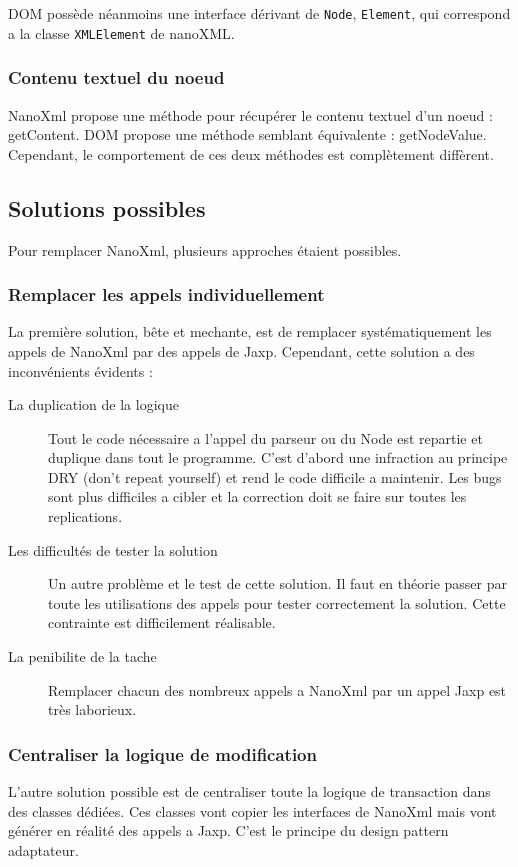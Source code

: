 DOM possède néanmoins une interface dérivant de \verb|Node|, \verb|Element|, qui correspond a la classe \verb|XMLElement| de nanoXML.

\subsubsection{Contenu textuel du noeud}
NanoXml propose une méthode pour récupérer le contenu textuel d'un noeud : getContent. DOM propose une méthode semblant équivalente : getNodeValue. Cependant, le comportement de ces deux méthodes est complètement diffèrent.


\subsection{Solutions possibles}
Pour remplacer NanoXml, plusieurs approches étaient possibles. 
\subsubsection{Remplacer les appels individuellement}
La première solution, bête et mechante, est de remplacer systématiquement les appels de NanoXml par des appels de Jaxp. Cependant, cette solution a des inconvénients évidents :
\begin{description}
\item[La duplication de la logique] Tout le code nécessaire a l'appel du parseur ou du Node est repartie et duplique dans tout le programme. C'est d'abord une infraction au principe DRY (don't repeat yourself) et rend le code difficile a maintenir. Les bugs sont plus difficiles a cibler et la correction doit se faire sur toutes les replications.
\item[Les difficultés de tester la solution] Un autre problème et le test de cette solution. Il faut en théorie passer par toute les utilisations des appels pour tester correctement la solution. Cette contrainte est difficilement réalisable.
\item[La penibilite de la tache] Remplacer chacun des nombreux appels a NanoXml par un appel Jaxp est très laborieux. 
\end{description}
\subsubsection{Centraliser la logique de modification}
L'autre solution possible est de centraliser toute la logique de transaction dans des classes dédiées. Ces classes vont copier les interfaces de NanoXml mais vont générer en réalité des appels a Jaxp. C'est le principe du design pattern adaptateur.

